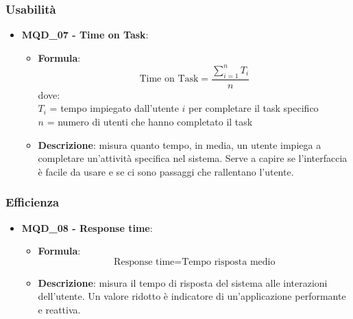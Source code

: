 \subsubsection{Usabilità}
\begin{itemize}
\item \textbf{MQD\_07 - Time on Task}:
    \begin{itemize}
        \item \textbf{Formula}:
    \[
        \text{Time on Task} = \frac{\sum_{i=1}^{n} T_i}{n}
    \]
    dove:\\
    $T_i$ = tempo impiegato dall'utente $i$ per completare il task specifico\\
    $n$ = numero di utenti che hanno completato il task
        \item \textbf{Descrizione}: misura quanto tempo, in media, un utente impiega a completare un'attività specifica nel sistema. Serve a capire se l'interfaccia è facile da usare e se ci sono passaggi che rallentano l'utente.
    \end{itemize}
\end{itemize}

\subsubsection{Efficienza}
\begin{itemize}
\item \textbf{MQD\_08 - Response time}:
    \begin{itemize}
        \item \textbf{Formula}:
        \[
            \text{Response time} = \text{Tempo risposta medio}
        \]
        \item \textbf{Descrizione}: misura il tempo di risposta del sistema alle interazioni dell’utente. Un valore ridotto è indicatore di un’applicazione performante e reattiva.
    \end{itemize}
\end{itemize}

